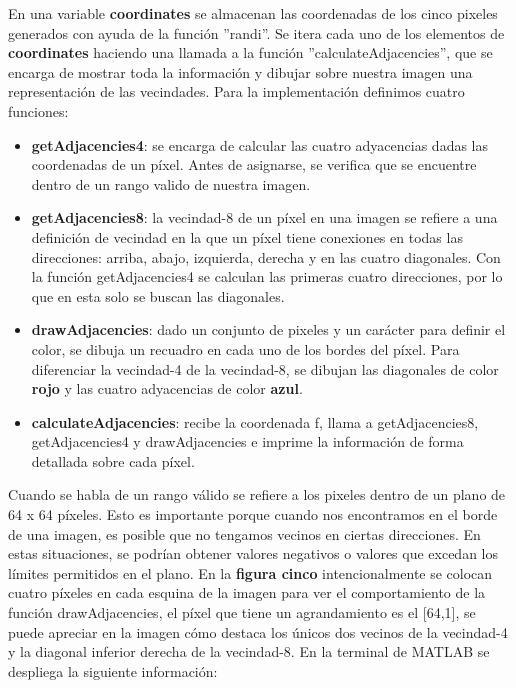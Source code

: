 \documentclass[
  journal=largetwo,
  manuscript=Practica-Dos,
  year=2024-1, %
  volume=37,
  spanish, %
]{cup-journal}
\begin{document}
En una variable \textbf{coordinates} se almacenan las coordenadas de los cinco pixeles generados con ayuda de la función ''randi''. Se itera cada uno de los elementos de \textbf{coordinates} haciendo una llamada a la función ''calculateAdjacencies'', que se encarga de mostrar toda la información y dibujar sobre nuestra imagen una representación de las vecindades. Para la implementación definimos cuatro funciones:

\begin{itemize}
    \item \textbf{getAdjacencies4}: se encarga de calcular las cuatro adyacencias dadas las coordenadas de un píxel. Antes de asignarse, se verifica que se encuentre dentro de un rango valido de nuestra imagen.
    \item \textbf{getAdjacencies8}: la vecindad-8 de un píxel en una imagen se refiere a una definición de vecindad en la que un píxel tiene conexiones en todas las direcciones: arriba, abajo, izquierda, derecha y en las cuatro diagonales. Con la función getAdjacencies4 se calculan las primeras cuatro direcciones, por lo que en esta solo se buscan las diagonales.
    \item \textbf{drawAdjacencies}: dado un conjunto de pixeles y un carácter para definir el color, se dibuja un recuadro en cada uno de los bordes del píxel. Para diferenciar la vecindad-4 de la vecindad-8, se dibujan las diagonales de color \textbf{rojo} y las cuatro adyacencias de color \textbf{azul}.
    \item \textbf{calculateAdjacencies}: recibe la coordenada f, llama a getAdjacencies8, getAdjacencies4 y drawAdjacencies e imprime la información de forma detallada sobre cada píxel.
\end{itemize}

Cuando se habla de un rango válido se refiere a los pixeles dentro de un plano de 64 x 64 píxeles. Esto es importante porque cuando nos encontramos en el borde de una imagen, es posible que no tengamos vecinos en ciertas direcciones. En estas situaciones, se podrían obtener valores negativos o valores que excedan los límites permitidos en el plano. En la \textbf{figura cinco} intencionalmente se colocan cuatro píxeles en cada esquina de la imagen para ver el comportamiento de la función drawAdjacencies, el píxel que tiene un agrandamiento es el [64,1], se puede apreciar en la imagen cómo destaca los únicos dos vecinos de la vecindad-4 y la diagonal inferior derecha de la vecindad-8. En la terminal de MATLAB se despliega la siguiente información:
\end{document}

